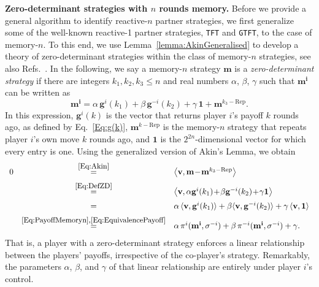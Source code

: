 \documentclass[11pt]{article}
\theoremstyle{plainCl1}
\theoremstyle{plainCl2}
\def\tft{\texttt{TFT}}
\def\gtft{\texttt{GTFT}}
\begin{document}
{\bf Zero-determinant strategies with $n$ rounds memory.}
Before we provide a general algorithm to identify reactive-$n$ partner strategies, we first generalize some of the well-known reactive-1 partner strategies, \tft{} and \gtft{}, to the case of memory-$n$. 
To this end, we use Lemma~\ref{lemma:AkinGeneralised} to develop a theory of zero-determinant strategies within the class of memory-$n$ strategies, see also Refs.~\citep{stewart:scientific:2016,ueda:RSOP:2021}.
In the following, we say a memory-$n$ strategy $\mathbf{m}$ is a {\it zero-determinant
strategy} if there are integers $k_1, k_2, k_3\!\le\!n$ and real numbers $\alpha$, $\beta$, $\gamma$ such
that $\mathbf{m^{i}}$ can be written as
\begin{equation} \label{Eq:DefZD}
\mathbf{m^{i}} = \alpha\, \mathbf{g}^i(k_1) + \beta\, \mathbf{g}^{-i}(k_2) + \gamma\, \mathbf{1} + \mathbf{m}^{k_3-\text{Rep}}. 
\end{equation}
In this expression, $\mathbf{g}^i(k)$ is the vector that returns player $i$'s payoff $k$ rounds ago, as defined by Eq.~\eqref{Eq:g(k)}, $\mathbf{m}^{k-\text{Rep}}$ is the memory-$n$ strategy that repeats player $i$'s own move $k$ rounds ago, and $\mathbf{1}$ is the $2^{2n}$-dimensional vector for which every entry is one. Using the generalized version of Akin's Lemma, we obtain
\begin{equation} \label{Eq:PayoffZD}
\begin{array}{lcl}
0 
&\stackrel{\mbox{\small \eqref{Eq:Akin}}}{=}  
&\big\langle \mathbf{v} , \mathbf{m}\!-\!\mathbf{m}^{k_3-\text{Rep}}\big\rangle\\[0.2cm]
&\stackrel{\mbox{\small \eqref{Eq:DefZD}}}{=} 
&\big\langle \mathbf{v} ,\alpha \mathbf{g}^i(k_1) \!+\! \beta \mathbf{g}^{-i}(k_2) \!+\! \gamma \mathbf{1} \big\rangle\\[0.2cm]
&= 
&\alpha \, \langle \mathbf{v},\mathbf{g}^i(k_1)\rangle + \beta \langle \mathbf{v},\mathbf{g}^{-i}(k_2) \rangle+\gamma\,\langle\mathbf{v},\mathbf{1}\rangle\\[0.2cm]
&\stackrel{\mbox{\small \eqref{Eq:PayoffMemoryn},\eqref{Eq:EquivalencePayoff}}}{=} 
&\alpha \, \pi^i(\mathbf{m^i},\sigma^{-i}) + \beta \, \pi^{-i}(\mathbf{m^i},\sigma^{-i}) + \gamma.
\end{array}
\end{equation}
That is, a player with a zero-determinant strategy enforces a linear relationship between the players' payoffs, irrespective of the co-player's strategy. 
Remarkably, the parameters $\alpha$, $\beta$, and $\gamma$ of that linear relationship are entirely under player $i$'s control.\\
\end{document}
